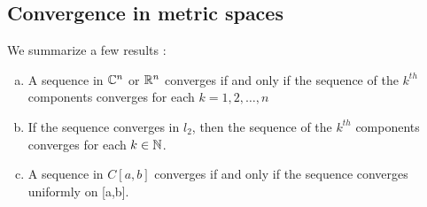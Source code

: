 \subsection{Convergence in metric spaces}
\begin{theorem}
    We summarize a few results :
    \begin{enumerate}[(a)]
        \item A sequence in $\mathbb C^n$ or $\mathbb R^n$ converges if and only if the sequence of the $k^{th}$ components converges for each $k = 1, 2, \dots, n$
        \item If the sequence converges in $l_2$, then the sequence of the $k^{th}$ components converges for each $k \in \mathbb N$.
        \item A sequence in $C[a,b]$ converges if and only if the sequence converges uniformly on [a,b].
    \end{enumerate}
\end{theorem}